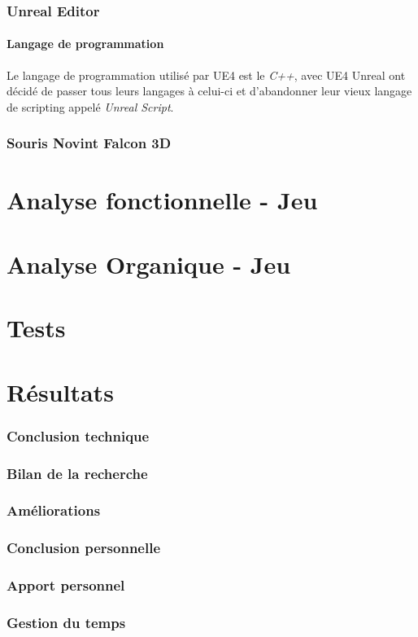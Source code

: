 \documentclass[11pt, a4paper, oneside]{article}
\begin{document}
\section{Unreal Editor}
\subsection{Langage de programmation}
Le langage de programmation utilisé par UE4 est le \textit{C++}, avec UE4 Unreal ont décidé de passer tous leurs langages à celui-ci et d'abandonner leur vieux langage de scripting appelé \textit{Unreal Script}.
\newpage
\section{Souris Novint Falcon 3D}
\newpage
\part{Analyse fonctionnelle - Jeu}
\newpage
\part{Analyse Organique - Jeu}
\newpage
\part{Tests}
\newpage
\part{Résultats} 
\section{Conclusion technique}
\section{Bilan de la recherche}
\section{Améliorations}
\section{Conclusion personnelle}
\section{Apport personnel}
\section{Gestion du temps}
\newpage
\end{document}
